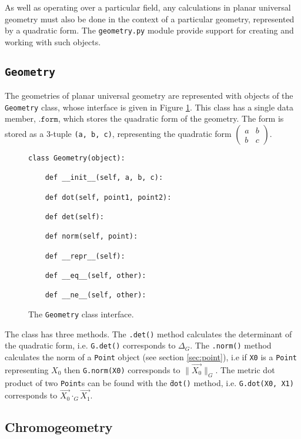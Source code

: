 As well as operating over a particular field, any calculations in planar universal geometry must also be done in the context of a particular geometry, represented by a quadratic form.
The \texttt{geometry.py} module provide support for creating and working with such objects.

\subsection{\texttt{Geometry}}

The geometries of planar universal geometry are represented with objects of the \texttt{Geometry} class, whose interface is given in Figure \ref{fig:geom}.
This class has a single data member, $\texttt{.form}$, which stores the quadratic form of the geometry.
The form is stored as a 3-tuple \texttt{(a, b, c)}, representing the quadratic form $\begin{pmatrix} a & b \\ b & c \end{pmatrix}$.

\begin{figure}[hbt!]
\begin{verbatim}
class Geometry(object):

    def __init__(self, a, b, c):

    def dot(self, point1, point2):

    def det(self):

    def norm(self, point):

    def __repr__(self):

    def __eq__(self, other):

    def __ne__(self, other):
\end{verbatim}
\caption{The \texttt{Geometry} class interface.}\label{fig:geom}
\end{figure}


The class has three methods.
The \texttt{.det()} method calculates the determinant of the quadratic form, i.e. \texttt{G.det()} corresponds to $\Delta_G$.
The \texttt{.norm()} method calculates the norm of a \texttt{Point} object (see section \ref{sec:point}), i.e if \texttt{X0} is a \texttt{Point} representing $X_0$ then \texttt{G.norm(X0)} corresponds to $\|\vec{X_0}\|_G$.
The metric dot product of two \texttt{Point}s can be found with the \texttt{\.dot()} method, i.e. \texttt{G.dot(X0, X1)} corresponds to $\vec{X_0}\cdot_G\vec{X_1}$.


\subsection{Chromogeometry}

